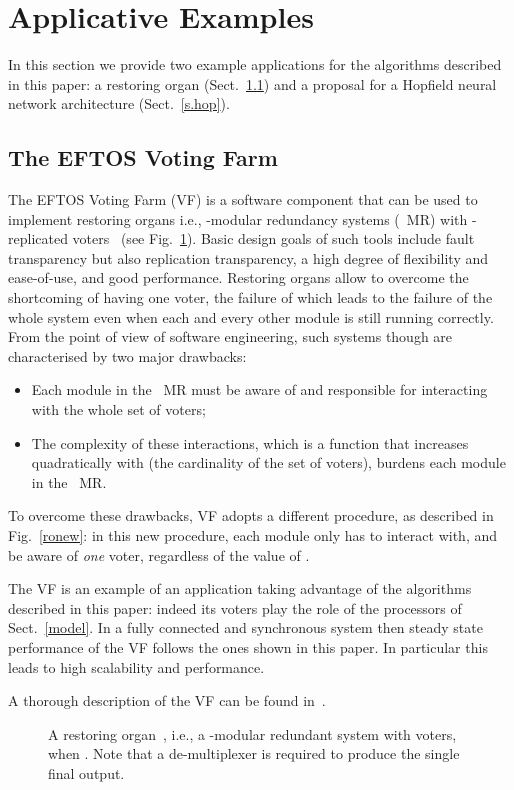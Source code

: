 \documentclass{elsart}
\def\nmr{\hbox{\kern-1pt MR}}
\begin{document}
\section{Applicative Examples}\label{vf}
In this section we provide two example applications for the algorithms described
in this paper: a restoring organ (Sect.~\ref{s.vf}) and a proposal for a Hopfield neural network
architecture (Sect.~\ref{s.hop}).

\subsection{The EFTOS Voting Farm}\label{s.vf}
The EFTOS Voting Farm (VF) is a 
software component that can be used to implement
restoring organs i.e., -modular
redundancy systems (\nmr) with
-replicated voters~\cite{John89a}
(see Fig.~\ref{ro}). Basic design goals of such tools include fault transparency
but also replication transparency,
a high degree of flexibility and ease-of-use, and good performance.
Restoring organs allow to overcome the shortcoming of having
one voter, the failure of which leads to the failure of the whole system
even when each and every other module is still running correctly.
From the point of view of software engineering, such systems
though are characterised by two major drawbacks:
\begin{itemize}
\item Each module in the \nmr{} must be aware of and responsible for
interacting with the whole set of voters;
\item The complexity of these interactions, which is a function that increases
quadratically with  (the cardinality of the set of voters),
burdens each module in the \nmr.
\end{itemize}
To overcome these drawbacks, VF adopts a different procedure, as
described in Fig.~\ref{ronew}: in this new procedure, each module only has
to interact with, and be aware of {\em one\/} voter,
regardless of the value of . 

The VF is an example of an application taking advantage of the algorithms
described in this paper: indeed its voters play the role of the processors 
of Sect.~\ref{model}. In a fully connected and synchronous system
then steady state performance of the VF follows the ones shown in this paper.
In particular this leads to high scalability and performance. 

A thorough description of the VF can be found in~\cite{DeDL98e}.

\begin{figure}
\centerline{}
\caption{A restoring organ~\cite{John89a}, i.e., a \kern-1pt-modular
  redundant system with  voters, when . Note that a de-multiplexer
is required to produce the single final output.}
\label{ro}
\end{figure}
\end{document}

